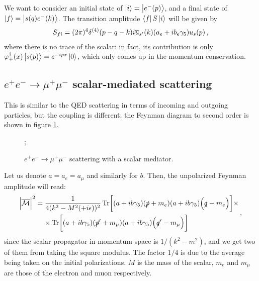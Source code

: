 \documentclass[main.tex]{subfiles}
\begin{document}
We want to consider an initial state of \(\ket{i} = \ket{e^{-}(p)}\), and a final state of \(\ket{f} = \ket{s(q) e^{-}(k)}\). 
The transition amplitude \(\bra{f} S \ket{i}\) will be given by 
%
\begin{align}
S_{fi}
= (2 \pi )^{4} \delta^{(4)} (p - q - k)
i\overline{u}_{s'}(k) \qty(a_e + i b_e \gamma_{5}) u_s (p)
\,,
\end{align}
%
where there is no trace of the scalar: in fact, its contribution is only  \(\varphi_{+} ^\dag (x) \ket{s(p)} = e^{-ipx} \ket{0}\), which only comes up in the momentum conservation. 

\subsection{\(e^{+} e^{-} \to \mu^+ \mu^-\) scalar-mediated scattering}

This is similar to the QED scattering in terms of incoming and outgoing particles, but the coupling is different: the Feynman diagram to second order is shown in figure \ref{fig:scalar-mediator-eemumu}.

\begin{figure}[ht]
\centering
{};
\caption{\(e^{+} e^{-} \to \mu^+ \mu^-\) scattering with a scalar mediator.}
\label{fig:scalar-mediator-eemumu}
\end{figure}

Let us denote \(a = a_e = a_\mu \) and similarly for \(b\).
Then, the unpolarized Feynman amplitude will read: 
%
\begin{align}
\begin{split}
\abs{\mathcal{\overline{M}}}^2
&= \frac{1}{4 (k^2- M^2 (+ i \epsilon))^2 }
\Tr[ (a + i b \gamma_5 ) (\slashed{p} + m_e) \qty(a + i b \gamma_5 ) \qty(\slashed{q} - m_e)] \times \\
&\phantom{=}\ 
\times \Tr[ (a + i b \gamma_5 ) (\slashed{p}' + m_\mu ) \qty(a + i b \gamma_5 ) \qty(\slashed{q}' - m_\mu )]
\end{split}
\,,
\end{align}
%
since the scalar propagator in momentum space is \(1/ (k^2 - m^2)\), and we get two of them from taking the square modulus.
The factor \(1/4\) is due to the average being taken on the initial polarizations. 
\(M\) is the mass of the scalar, \(m_e\) and \(m_\mu\) are those of the electron and muon respectively. 
\end{document}

